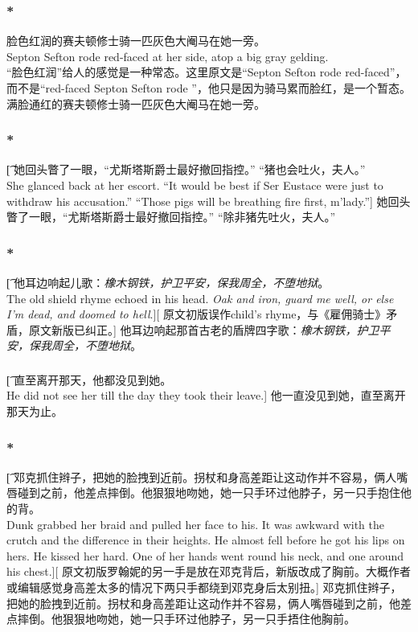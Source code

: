 \documentclass[12pt,a4paper]{article}
\newcommand{\h}[1]{{\color{red}#1}\\}
\newcommand{\la}[1]{{\color{blue}#1}\\}
\begin{document}
\subsubsection{\color{red}*}\la{
	脸色红润的赛夫顿修士骑一匹灰色大阉马在她一旁。\\
	Septon Sefton rode red-faced at her side, atop a big gray gelding.}\h{
	“脸色红润”给人的感觉是一种常态。这里原文是“Septon Sefton rode red-faced”，而不是“red-faced Septon Sefton rode ”，他只是因为骑马累而脸红，是一个暂态。}
	满脸通红的赛夫顿修士骑一匹灰色大阉马在她一旁。
	
\subsubsection{\color{red}*}\t[	 	
	她回头瞥了一眼，“尤斯塔斯爵士最好撤回指控。”
	“猪也会吐火，夫人。”\\
	She glanced back at her escort. “It would be best if Ser Eustace were just to withdraw his accusation.”
	“Those pigs will be breathing fire first, m'lady.”]
	她回头瞥了一眼，“尤斯塔斯爵士最好撤回指控。”
	“除非猪先吐火，夫人。”
	 
\subsubsection{\color{red}*}\t[	 
 	他耳边响起儿歌：\emph{橡木钢铁，护卫平安，保我周全，不堕地狱}。\\
 	The old shield rhyme echoed in his head. \emph{Oak and iron, guard me well, or else I'm dead, and doomed to hell}.][
 	原文初版误作child's rhyme，与《雇佣骑士》矛盾，原文新版已纠正。]
 	他耳边响起那首古老的盾牌四字歌：\emph{橡木钢铁，护卫平安，保我周全，不堕地狱}。
	
\subsubsection{}\t[	 	
	直至离开那天，他都没见到她。\\
	He did not see her till the day they took their leave.]
	他一直没见到她，直至离开那天为止。
	
\subsubsection{\color{red}*}\t[	 
	邓克抓住辫子，把她的脸拽到近前。拐杖和身高差距让这动作并不容易，俩人嘴唇碰到之前，他差点摔倒。他狠狠地吻她，她一只手环过他脖子，另一只手抱住他的背。\\
	Dunk grabbed her braid and pulled her face to his. It was awkward with the crutch and the difference in their heights. He almost fell before he got his lips on hers. He kissed her hard. One of her hands went round his neck, and one around his chest.][
	原文初版罗翰妮的另一手是放在邓克背后，新版改成了胸前。大概作者或编辑感觉身高差太多的情况下两只手都绕到邓克身后太别扭。]
	邓克抓住辫子，把她的脸拽到近前。拐杖和身高差距让这动作并不容易，俩人嘴唇碰到之前，他差点摔倒。他狠狠地吻她，她一只手环过他脖子，另一只手捂住他胸前。
	 	
\end{document}
